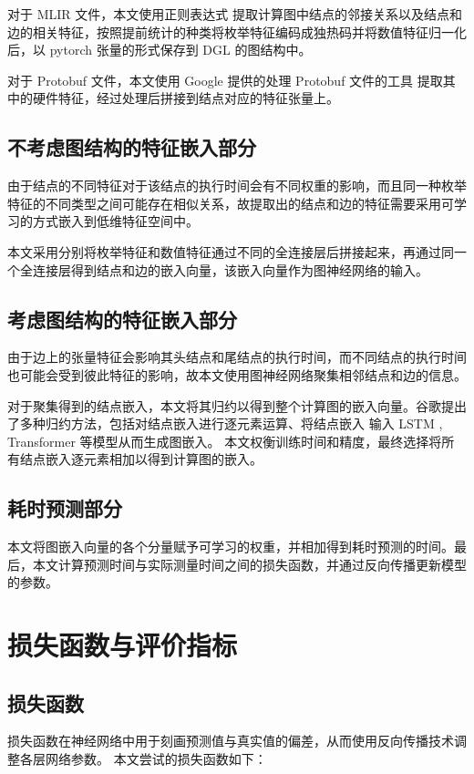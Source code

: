对于 MLIR 文件，本文使用正则表达式 \cite{regex} 提取计算图中结点的邻接关系以及结点和边的相关特征，按照提前统计的种类将枚举特征编码成独热码并将数值特征归一化后，以 pytorch \cite{NEURIPS2019_9015} 张量的形式保存到 DGL\cite{DGL} 的图结构中。

对于 Protobuf 文件，本文使用 Google 提供的处理 Protobuf 文件的工具 \cite{Google-pb} 提取其中的硬件特征，经过处理后拼接到结点对应的特征张量上。

\subsection{不考虑图结构的特征嵌入部分}
由于结点的不同特征对于该结点的执行时间会有不同权重的影响，而且同一种枚举特征的不同类型之间可能存在相似关系，故提取出的结点和边的特征需要采用可学习的方式嵌入到低维特征空间中。

本文采用分别将枚举特征和数值特征通过不同的全连接层后拼接起来，再通过同一个全连接层得到结点和边的嵌入向量，该嵌入向量作为图神经网络的输入。

\subsection{考虑图结构的特征嵌入部分}
由于边上的张量特征会影响其头结点和尾结点的执行时间，而不同结点的执行时间也可能会受到彼此特征的影响，故本文使用图神经网络聚集相邻结点和边的信息。

对于聚集得到的结点嵌入，本文将其归约以得到整个计算图的嵌入向量。谷歌\cite{Alearned}提出了多种归约方法，包括对结点嵌入进行逐元素运算、将结点嵌入
输入 LSTM \cite{LSTM1}, Transformer \cite{Transformer} 等模型从而生成图嵌入。
本文权衡训练时间和精度，最终选择将所有结点嵌入逐元素相加以得到计算图的嵌入。

\subsection{耗时预测部分}
本文将图嵌入向量的各个分量赋予可学习的权重，并相加得到耗时预测的时间。最后，本文计算预测时间与实际测量时间之间的损失函数，并通过反向传播更新模型的参数。

\section{损失函数与评价指标}

\subsection{损失函数}
损失函数在神经网络中用于刻画预测值与真实值的偏差，从而使用反向传播技术调整各层网络参数。
本文尝试的损失函数如下：
